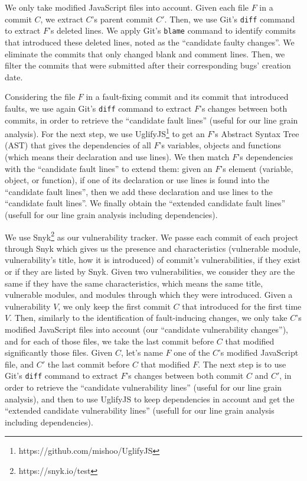 \noindent
We only take modified JavaScript files into account. Given each file $F$ in a commit $C$, we extract $C$'s parent commit $C'$. Then, we use Git's \texttt{diff} command to extract $F$'s deleted lines. We apply Git's \texttt{blame} command to identify commits that introduced these deleted lines, noted as the ``candidate faulty changes''. We eliminate the commits that only changed blank and comment lines. Then, we filter the commits that were submitted after their corresponding bugs' creation date. {\color{blue}Considering the file $F$ in a fault-fixing commit and its commit that introduced faults, we use again Git's \texttt{diff} command to extract $F$'s changes between both commits, in order to retrieve the ``candidate fault lines'' (useful for our line grain analysis). For the next step, we use UglifyJS\footnote{https://github.com/mishoo/UglifyJS} to get an $F$'s Abstract Syntax Tree (AST) that gives the dependencies of all $F$'s variables, objects and functions (which means their declaration and use lines). We then match $F$'s dependencies with the ``candidate fault lines'' to extend them: given an $F$'s element (variable, object, or function), if one of its declaration or use lines is found into the ``candidate fault lines'', then we add these declaration and use lines to the ``candidate fault lines''. We finally obtain the ``extended candidate fault lines'' (usefull for our line grain analysis including dependencies).

 We use Snyk\footnote{https://snyk.io/test} as our vulnerability tracker. We passe each commit of each project through Snyk which gives us the presence and characteristics (vulnerable module, vulnerability's title, how it is introduced) of commit's vulnerabilities, if they exist or if they are listed by Snyk. Given two vulnerabilities, we consider they are the same if they have the same characteristics, which means the same title, vulnerable modules, and modules through which they were introduced. Given a vulnerability $V$, we only keep the first commit $C$ that introduced for the first time $V$. Then, similarly to the identification of fault-inducing changes, we only take $C$'s modified JavaScript files into account (our ``candidate vulnerability changes''), and for each of those files, we take the last commit before $C$ that modified significantly those files. Given $C$, let's name $F$ one of the $C$'s modified JavaScript file, and $C'$ the last commit before $C$ that modified $F$. The next step is to use Git's \texttt{diff} command to extract $F$'s changes between both commit $C$ and $C'$, in order to retrieve the ``candidate vulnerability lines'' (useful for our line grain analysis), and then to use UglifyJS to keep dependencies in account and get the ``extended candidate vulnerability lines'' (usefull for our line grain analysis including dependencies).
}

